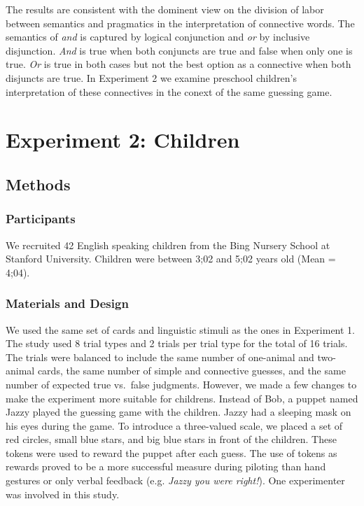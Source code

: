 \documentclass[10pt, letterpaper]{article}
\begin{document}
The results are consistent with the dominent view on the division of
labor between semantics and pragmatics in the interpretation of
connective words. The semantics of \emph{and} is captured by logical
conjunction and \emph{or} by inclusive disjunction. \emph{And} is true
when both conjuncts are true and false when only one is true. \emph{Or}
is true in both cases but not the best option as a connective when both
disjuncts are true. In Experiment 2 we examine preschool children's
interpretation of these connectives in the conext of the same guessing
game.

\section{Experiment 2: Children}\label{experiment-2-children}

\subsection{Methods}\label{methods-1}

\subsubsection{Participants}\label{participants-1}

We recruited 42 English speaking children from the Bing Nursery School
at Stanford University. Children were between 3;02 and 5;02 years old
(Mean = 4;04).

\subsubsection{Materials and Design}\label{materials-and-design-1}

We used the same set of cards and linguistic stimuli as the ones in
Experiment 1. The study used 8 trial types and 2 trials per trial type
for the total of 16 trials. The trials were balanced to include the same
number of one-animal and two-animal cards, the same number of simple and
connective guesses, and the same number of expected true vs.~false
judgments. However, we made a few changes to make the experiment more
suitable for childrens. Instead of Bob, a puppet named Jazzy played the
guessing game with the children. Jazzy had a sleeping mask on his eyes
during the game. To introduce a three-valued scale, we placed a set of
red circles, small blue stars, and big blue stars in front of the
children. These tokens were used to reward the puppet after each guess.
The use of tokens as rewards proved to be a more successful measure
during piloting than hand gestures or only verbal feedback (e.g.
\emph{Jazzy you were right!}). One experimenter was involved in this
study.
\end{document}
